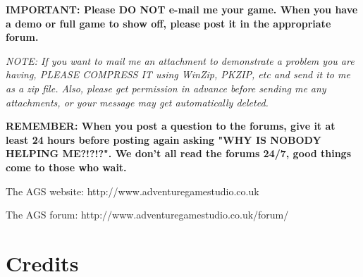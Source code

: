 \bf{IMPORTANT: Please DO NOT e-mail me your game.} When you have a demo or
full game to show off, please post it in the appropriate forum.

\it{NOTE:} If you want to mail me an attachment to demonstrate a problem you are
having, PLEASE COMPRESS IT using WinZip, PKZIP, etc and send it to me as a
zip file. Also, please get permission in advance before sending me any
attachments, or your message may get automatically deleted.

\bf{REMEMBER:} When you post a question to the forums, give it at least 24
hours before posting again asking "WHY IS NOBODY HELPING ME?!?!?". We don't
all read the forums 24/7, good things come to those who wait.

The AGS website: http://www.adventuregamestudio.co.uk

The AGS forum:   http://www.adventuregamestudio.co.uk/forum/


\chapter{Credits}\label{Credits}%

